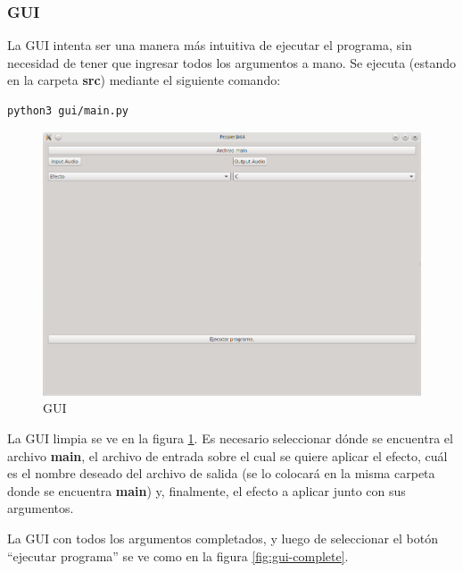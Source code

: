 \documentclass[a4paper,spanish,12pt]{article}
\begin{document}
\newpage\subsubsection{GUI}
\label{subsec:gui}
La GUI intenta ser una manera más intuitiva de ejecutar el programa, sin necesidad de tener que ingresar todos los argumentos a mano. Se ejecuta (estando en la carpeta \textbf{src}) mediante el siguiente comando:

\lstset{language=bash}
\begin{lstlisting}[frame=single]
python3 gui/main.py
\end{lstlisting}

\begin{figure}[H]
    \centering
    \includegraphics[scale=0.68]{imagenes/gui.png}
    \caption{GUI}
    \label{fig:gui}
\end{figure}

La GUI limpia se ve en la figura \ref{fig:gui}. Es necesario seleccionar dónde se encuentra el archivo \textbf{main}, el archivo de entrada sobre el cual se quiere aplicar el efecto, cuál es el nombre deseado del archivo de salida (se lo colocará en la misma carpeta donde se encuentra \textbf{main}) y, finalmente, el efecto a aplicar junto con sus argumentos.\vspace{\baselineskip}

La GUI con todos los argumentos completados, y luego de seleccionar el botón ``ejecutar programa'' se ve como en la figura \ref{fig:gui-complete}.\vspace{\baselineskip}
\end{document}
